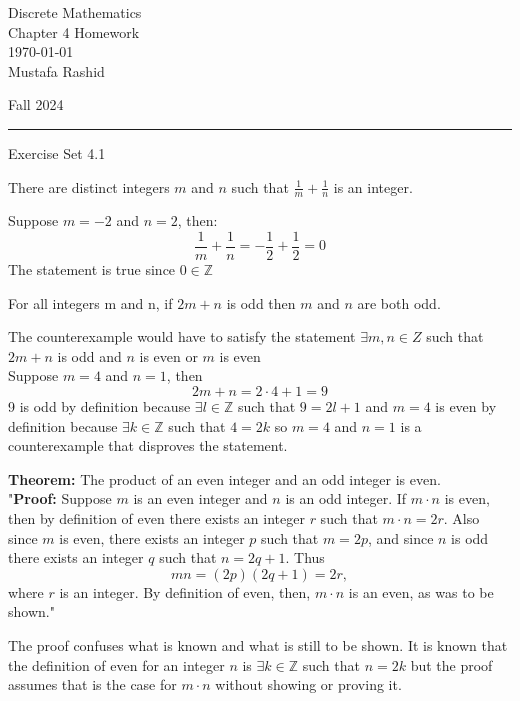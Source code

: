 \documentclass[12pt,letterpaper, onecolumn]{exam}
\begin{document}
	
	\begingroup  
	\noindent\LARGE Discrete Mathematics\\
	\noindent\LARGE Chapter 4 Homework\\
	\noindent\large \today\\
	\noindent\large Mustafa Rashid\par
	\noindent\large Fall 2024\par
	\endgroup
	\rule{\textwidth}{0.4pt}
	\pointsdroppedatright
	\printanswers
	\renewcommand{\solutiontitle}{\noindent\textbf{Ans:}\enspace}  
	
	\centering\large Exercise Set 4.1\\
	\begin{questions}
		\setcounter{question}{4} \question  There are distinct integers $m$ and $n$ such that $\frac{1}{m}+\frac{1}{n}$ is an integer.
		
		\begin{solution}
			Suppose $m=-2$ and $n=2$, then:
			$$\frac{1}{m}+\frac{1}{n} = -\frac{1}{2}+\frac{1}{2}=0$$
			The statement is true since $0 \in \mathbb{Z}$
		\end{solution}
		
		\setcounter{question}{12} \question For all integers m and n, if $2m+n$ is odd then $m$ and $n$ are both odd.
		
		\begin{solution}
			The counterexample would have to satisfy the statement $\exists m,n \in Z$ such that $2m+n$ is odd and $n$ is even or $m$ is even\\
			Suppose $m=4$ and $n=1$, then
			$$2m+n = 2\cdot4 + 1 = 9$$
			9 is odd by definition because $\exists l \in \mathbb{Z}$ such that $9=2l+1$ and $m=4$ is even by definition because $\exists k \in \mathbb{Z}$ such that $4=2k$ so $m=4$ and $n=1$ is a counterexample that disproves the statement.
		\end{solution}
		
		\setcounter{question}{40} \question \textbf{Theorem:} The product of an even integer and an odd integer is even.\\
		"\textbf{Proof:} Suppose $m$ is an even integer and $n$ is an odd integer. If $m\cdot n$ is even, then by definition of even there exists an integer $r$ such that $m\cdot n = 2r$. Also since $m$ is even, there exists an integer $p$ such that $m=2p$, and since $n$ is odd there exists an integer $q$ such that $n=2q+1$. Thus $$mn = (2p)(2q+1) = 2r,$$ where $r$ is an integer. By definition of even, then, $m\cdot n$ is an even, as was to be shown."
		\begin{solution}
			The proof confuses what is known and what is still to be shown. It is known that the definition of even for an integer $n$ is $\exists k \in \mathbb{Z}$ such that $n=2k$ but the proof assumes that is the case for $m\cdot n$ without showing or proving it.
		\end{solution}
		

\end{questions}
\end{document}
